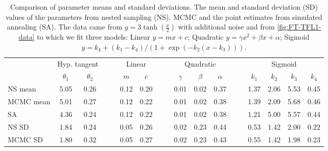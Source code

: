 \begin{table*}[!htbp]
  \centering
  {\setlength{\tabcolsep}{0.4em}
  \begin{tabular}{lccc@{\hspace{0.8em}}cccc@{\hspace{0.8em}}ccccc@{\hspace{0.8em}}ccccc}
    \toprule
    & \multicolumn{2}{c}{Hyp. tangent} &&& \multicolumn{2}{c}{Linear} &&& \multicolumn{3}{c}{Quadratic} &&& \multicolumn{4}{c}{Sigmoid} \\    
    \cmidrule(lr){2-3} \cmidrule(lr){6-7} \cmidrule(lr){10-12} \cmidrule(lr){15-18}
    & $\theta_1$ & $\theta_2$ &&& $m$ & $c$ &&& $\gamma$ & $\beta$ & $\alpha$ &&& $k_1$ & $k_2$ & $k_3$ & $k_4$ \\
    \cmidrule(lr){2-2}\cmidrule(lr){3-3}\cmidrule(lr){6-6}\cmidrule(lr){7-7}\cmidrule(lr){10-10}\cmidrule(lr){11-11}\cmidrule(lr){12-12}\cmidrule(lr){15-15}\cmidrule(lr){16-16}\cmidrule(lr){17-17}\cmidrule(lr){18-18}
    NS mean & 5.05 & 0.26 &&& 0.12 & 0.20 &&& 0.01 & 0.02 & 0.37 &&& 1.37 & 2.06 & 5.53 & 0.45 \\
    MCMC mean & 5.01 & 0.27 &&& 0.12 & 0.22 &&& 0.01 & 0.02 & 0.38 &&& 1.39 & 2.09 & 5.68 & 0.46 \\    
    SA & 4.36 & 0.24 &&& 0.12 & 0.22 &&& 0.01 & 0.02 & 0.38 &&& 1.21 & 5.00 & 5.57 & 0.44 \\
    \cmidrule{2-18}
    NS SD & 1.84 & 0.24 &&& 0.05 & 0.26 &&& 0.02 & 0.23 & 0.44 &&& 0.53 & 1.42 & 2.00 & 0.22 \\
    MCMC SD & 1.80 & 0.32 &&& 0.05 & 0.27 &&& 0.02 & 0.23 & 0.43 &&& 0.55 & 1.42 & 1.98 & 0.23 \\
    \bottomrule
  \end{tabular}}
    \caption{Comparison of parameter means and standard deviations.
    The mean and standard deviation (SD) values of the parameters from nested sampling (NS), MCMC and the point estimates from simulated annealing (SA).
    The data came from $y = 3\tanh\left(\frac{x}{2}\right)$ with additional noise and from \autoref{fig:FT-TFL1-data} to which we fit three models:
    Linear $y=mx+c$; Quadratic $y = \gamma x^2 + \beta x + \alpha$; Sigmoid $y = k_4 + (k_1-k_4)/(1+\exp(-k_2(x-k_3)))$.
  }
  \label{tab:MCMC-NS}
\end{table*}

